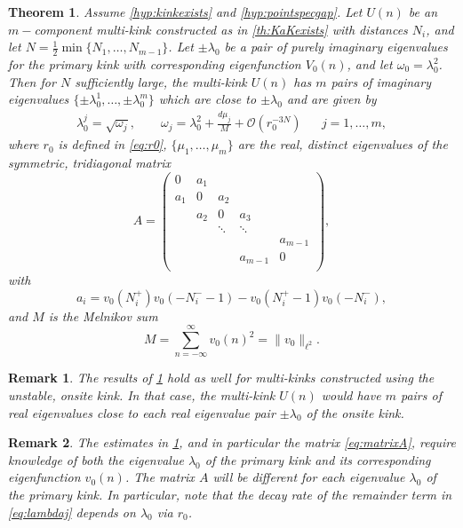 \documentclass[12pt,reqno]{amsart}
\newtheorem{theorem}{Theorem}
\newtheorem{remark}{Remark}
\begin{document}
\begin{theorem}\label{th:stability}
Assume \cref{hyp:kinkexists} and \cref{hyp:pointspecgap}.
Let $U(n)$ be an $m-$component multi-kink constructed as in \cref{th:KaKexists} with distances $N_i$, and let $N = \frac{1}{2} \min\{ N_1, \dots, N_{m-1}\}$. Let $\pm \lambda_0$ be a pair of purely imaginary eigenvalues for the primary kink with corresponding eigenfunction $V_0(n)$, and let $\omega_0 = \lambda_0^2$. Then for $N$ sufficiently large, the multi-kink $U(n)$ has $m$ pairs of imaginary eigenvalues $\{\pm \lambda_0^1, \dots, \pm \lambda_0^m \}$ which are close to $\pm \lambda_0$ and are given by
\begin{align}\label{eq:lambdaj}
	\lambda_0^j = \sqrt{\omega_j}, \qquad
	\omega_j = \lambda_0^2 + \frac{d \mu_j}{M} + \mathcal{O}(r_0^{-3N}) && j = 1, \dots, m,
\end{align}
where $r_0$ is defined in \cref{eq:r0}, $\{ \mu_1, \dots, \mu_m \}$ are the real, distinct eigenvalues of the symmetric, tridiagonal matrix
\begin{equation}\label{eq:matrixA}
	A = \begin{pmatrix}
	0 & a_1 & & & \\
	a_1 & 0 & a_2 \\
	& a_2 & 0 & a_3 \\
	& & \ddots & \ddots & \\
	& & & & a_{m-1}  \\
	& & & a_{m-1} & 0  \\
	\end{pmatrix},
\end{equation}
with 
\begin{equation}\label{eq:ai}
	a_i = v_0(N_i^+)v_0(-N_i^- - 1) - v_0(N_i^+ - 1)v_0(-N_i^-),
\end{equation}
and $M$ is the Melnikov sum
\begin{equation}\label{eq:Minth}
	M = \sum_{n = -\infty}^{\infty} v_0(n)^2 = \| v_0 \|_{\ell^2}.
	\end{equation}
\end{theorem}

\begin{remark}\label{remark:unstablekink}
	The results of \cref{th:stability} hold as well for multi-kinks constructed using the unstable, onsite kink. In that case, the multi-kink $U(n)$ would have $m$ pairs of real eigenvalues close to each real eigenvalue pair $\pm \lambda_0$ of the onsite kink.
\end{remark}

\begin{remark}\label{remark:kk}
The estimates in \cref{th:stability}, and in particular the matrix \cref{eq:matrixA}, require knowledge of both the eigenvalue $\lambda_0$ of the primary kink and its corresponding eigenfunction $v_0(n)$. The matrix $A$ will be different for each eigenvalue $\lambda_0$ of the primary kink. In particular, note that the decay rate of the remainder term in \cref{eq:lambdaj} depends on $\lambda_0$ via $r_0$.
\end{remark}
\end{document}
